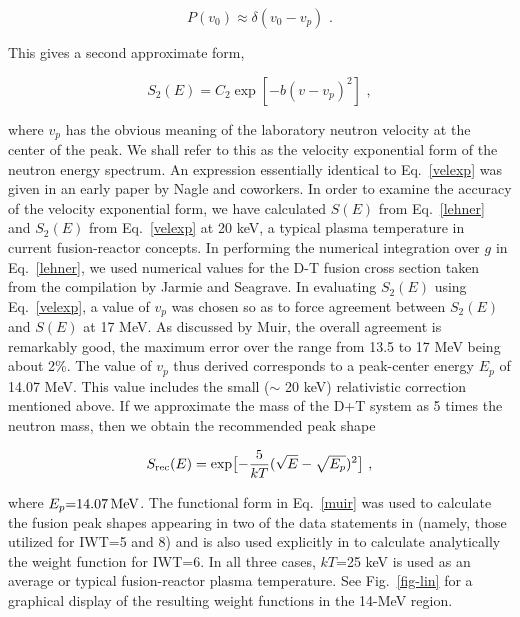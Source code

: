 \begin{equation}
  P(v_0) \approx \delta(v_0-v_p) \,\,.
\end{equation}

\noindent
This gives a second approximate form,

\begin{equation}
  S_2(E)=C_2 \exp[-b(v-v_p)^2] \,\,,
\label{velexp}
\end{equation}

\noindent
where $v_p$ has the obvious meaning of the laboratory neutron
velocity at the center of the peak.  We shall refer to this as
the velocity exponential form of the neutron energy spectrum.
An expression essentially identical to Eq.~\ref{velexp} was
given in an early paper by Nagle and coworkers\cite{two}.
In order to examine the accuracy of the velocity exponential form,
we have calculated $S(E)$ from Eq.~\ref{lehner}
and $S_2(E)$ from Eq.~\ref{velexp}
at 20 keV, a typical plasma temperature in current fusion-reactor
concepts.  In performing the numerical integration over $g$ in
Eq.~\ref{lehner}, we used numerical values for the D-T fusion cross
section taken from the compilation by Jarmie and Seagrave\cite{three}.
In evaluating $S_2(E)$ using Eq.~\ref{velexp}, a value of $v_p$ was
chosen so as to force agreement between $S_2(E)$ and $S(E)$ at
17 MeV.  As discussed by Muir\cite{four}, the overall
agreement is remarkably good, the maximum error
over the range from 13.5 to 17 MeV being about 2\%.  The value of
$v_p$ thus derived corresponds to a peak-center energy $E_p$
of 14.07 MeV.  This value includes the small ($\sim$ 20 keV)
relativistic correction mentioned above.  If we approximate the
mass of the D{+}T system as 5 times the neutron mass, then we
obtain the recommended peak shape

\begin{equation}
  S_{\rm rec}(E)=\exp \bigl[ -{5 \over{kT}}(\sqrt{E}
  -\sqrt{E_p})^2 \bigr] \,\,,
\label{muir}
\end{equation}

\noindent
where $E_p{=}14.07\,{\rm MeV}$.  The functional form in Eq.~\ref{muir}
was used to calculate the fusion peak shapes appearing in two
of the data statements in 
(namely, those utilized for IWT=5 and 8) and  is also  used explicitly
in  to calculate analytically
the weight function for IWT=6.  In all three cases, $kT$=25 keV is
used as an average or typical fusion-reactor plasma temperature.
See Fig.~\ref{fig-lin} for a graphical display of the resulting
weight functions in the 14-MeV region.

